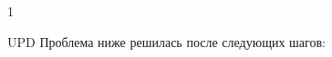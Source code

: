 \documentclass[a4paper,11pt]{article}
\begin{document}
\Large
1 
\begin{center}
\label{fig:image}
\end{center}
\begin{center}
\label{fig:image}
\end{center}
\begin{center}
\label{fig:image}
\end{center}
\newpage
UPD
Проблема ниже решилась после следующих шагов:
\begin{center}
\label{fig:image}
\end{center}
\end{document}
